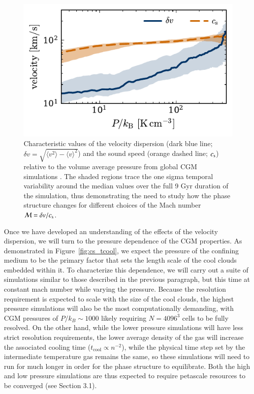 \documentclass[11pt,letterpaper,english]{article}
\begin{document}
\begin{figure}[h]
    \centering
    \begin{minipage}{0.6\textwidth}
        \includegraphics[width=\textwidth]{../figures/velocity_P.pdf} 
    \end{minipage}\hfill
    \begin{minipage}{0.4\textwidth}
        \centering
\caption{Characteristic values of the velocity dispersion (dark blue line; $\delta v = \sqrt{\langle v^2 \rangle - \langle v \rangle^2}$) and the sound speed (orange dashed line; $c_{\rm s}$) relative to the volume average pressure from global CGM simulations \cite{Fielding17}. The shaded regions trace the one sigma temporal variability around the median values over the full 9 Gyr duration of the simulation, thus demonstrating the need to study how the phase structure changes for different choices of the Mach number $\mathcal{M} = \delta v /  c_{\rm s}$. \label{fig:velocities}} 
\end{minipage}
\end{figure}



Once we have developed an understanding of the effects of the velocity dispersion, we will turn to the pressure dependence of the CGM properties. As demonstrated in Figure~\ref{fig:cs_tcool}, we expect the pressure of the confining medium to be the primary factor that sets the length scale of the cool clouds embedded within it. To characterize this dependence, we will carry out a suite of simulations similar to those described in the previous paragraph, but this time at constant mach number while varying the pressure. Because the resolution requirement is expected to scale with the size of the cool clouds, the highest pressure simulations will also be the most computationally demanding, with CGM pressures of $P/k_B \sim 1000$ likely requiring $N = 4096^3$ cells to be fully resolved. On the other hand, while the lower pressure simulations will have less strict resolution requirements, the lower average density of the gas will increase the associated cooling time ($t_\mathrm{cool} \propto n^{-2}$), while the physical time step set by the intermediate temperature gas remains the same, so these simulations will need to run for much longer in order for the phase structure to equilibrate. Both the high and low pressure simulations are thus expected to require petascale resources to be converged (see Section 3.1).
\end{document}
